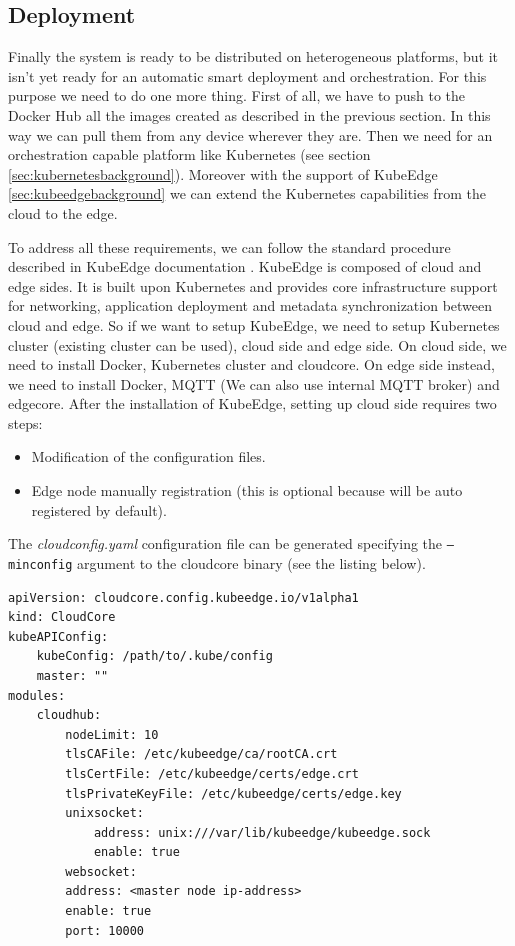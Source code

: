 \subsection{Deployment}
Finally the system is ready to be distributed on heterogeneous platforms, but it isn't yet ready for an automatic smart deployment and orchestration.
For this purpose we need to do one more thing. First of all, we have to push to the Docker Hub all the images created as described in the previous section. In this way we can pull them from any device wherever they are. Then we need for an orchestration capable platform like Kubernetes (see section \ref{sec:kubernetesbackground}). Moreover with the support of KubeEdge \ref{sec:kubeedgebackground} we can extend the Kubernetes capabilities from the cloud to the edge.

To address all these requirements, we can follow the standard procedure described in KubeEdge documentation \cite{kubeedgedoc}.
KubeEdge is composed of cloud and edge sides. It is built upon Kubernetes and provides core infrastructure support for networking, application deployment and metadata synchronization between cloud and edge. So if we want to setup KubeEdge, we need to setup Kubernetes cluster (existing cluster can be used), cloud side and edge side.
On cloud side, we need to install Docker, Kubernetes cluster and cloudcore. On edge side instead, we need to install Docker, MQTT (We can also use internal MQTT broker) and edgecore. 
After the installation of KubeEdge, setting up cloud side requires two steps: 
\begin{itemize}
	\item Modification of the configuration files.
	\item Edge node manually registration (this is optional because will be auto registered by default).
\end{itemize}

The \textit{cloudconfig.yaml} configuration file can be generated specifying the \texttt{--minconfig} argument to the cloudcore binary (see the listing below).
\begin{verbatim}
apiVersion: cloudcore.config.kubeedge.io/v1alpha1
kind: CloudCore
kubeAPIConfig:
    kubeConfig: /path/to/.kube/config
    master: ""
modules:
    cloudhub:
        nodeLimit: 10
        tlsCAFile: /etc/kubeedge/ca/rootCA.crt
        tlsCertFile: /etc/kubeedge/certs/edge.crt
        tlsPrivateKeyFile: /etc/kubeedge/certs/edge.key
        unixsocket:
            address: unix:///var/lib/kubeedge/kubeedge.sock
            enable: true
        websocket:
        address: <master node ip-address>
        enable: true
        port: 10000
\end{verbatim}


